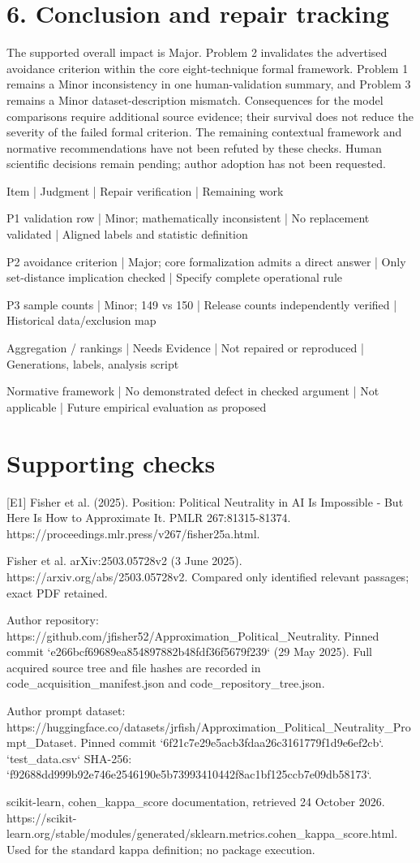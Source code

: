 \documentclass[10pt]{article}
\begin{document}
\section*{6. Conclusion and repair tracking}
The supported overall impact is Major. Problem 2 invalidates the advertised avoidance criterion within the core eight-technique formal framework. Problem 1 remains a Minor inconsistency in one human-validation summary, and Problem 3 remains a Minor dataset-description mismatch. Consequences for the model comparisons require additional source evidence; their survival does not reduce the severity of the failed formal criterion. The remaining contextual framework and normative recommendations have not been refuted by these checks. Human scientific decisions remain pending; author adoption has not been requested.\par
Item | Judgment | Repair verification | Remaining work\par
P1 validation row | Minor; mathematically inconsistent | No replacement validated | Aligned labels and statistic definition\par
P2 avoidance criterion | Major; core formalization admits a direct answer | Only set-distance implication checked | Specify complete operational rule\par
P3 sample counts | Minor; 149 vs 150 | Release counts independently verified | Historical data/exclusion map\par
Aggregation / rankings | Needs Evidence | Not repaired or reproduced | Generations, labels, analysis script\par
Normative framework | No demonstrated defect in checked argument | Not applicable | Future empirical evaluation as proposed\par
\section*{Supporting checks}
[E1] Fisher et al. (2025). Position: Political Neutrality in AI Is Impossible - But Here Is How to Approximate It. PMLR 267:81315-81374. https://proceedings.mlr.press/v267/fisher25a.html.\par
Fisher et al. arXiv:2503.05728v2 (3 June 2025). https://arxiv.org/abs/2503.05728v2. Compared only identified relevant passages; exact PDF retained.\par
Author repository: https://github.com/jfisher52/Approximation\_Political\_Neutrality. Pinned commit `e266bcf69689ea854897882b48fdf36f5679f239` (29 May 2025). Full acquired source tree and file hashes are recorded in code\_acquisition\_manifest.json and code\_repository\_tree.json.\par
Author prompt dataset: https://huggingface.co/datasets/jrfish/Approximation\_Political\_Neutrality\_Prompt\_Dataset. Pinned commit `6f21c7e29e5acb3fdaa26c3161779f1d9e6ef2cb`. `test\_data.csv` SHA-256: `f92688dd999b92e746e2546190e5b73993410442f8ac1bf125ccb7e09db58173`.\par
scikit-learn, cohen\_kappa\_score documentation, retrieved 24 October 2026. https://scikit-learn.org/stable/modules/generated/sklearn.metrics.cohen\_kappa\_score.html. Used for the standard kappa definition; no package execution.\par
\end{document}
